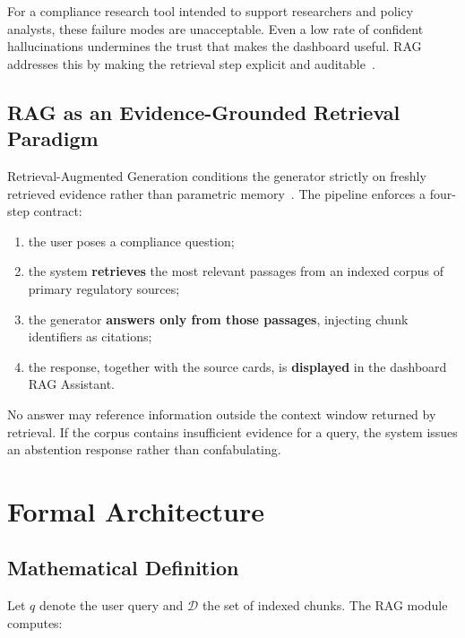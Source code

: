 For a compliance research tool intended to support researchers and policy analysts,
these failure modes are unacceptable. Even a low rate of confident hallucinations
undermines the trust that makes the dashboard useful. RAG addresses this by making
the retrieval step explicit and auditable~\cite{lewis2020rag}.

\subsection{RAG as an Evidence-Grounded Retrieval Paradigm}
\label{sec:rag-paradigm}

Retrieval-Augmented Generation conditions the generator strictly on freshly retrieved
evidence rather than parametric memory~\cite{lewis2020rag,karpukhin2020}. The
pipeline enforces a four-step contract:

\begin{enumerate}[noitemsep]
  \item the user poses a compliance question;
  \item the system \textbf{retrieves} the most relevant passages from an indexed
        corpus of primary regulatory sources;
  \item the generator \textbf{answers only from those passages}, injecting chunk
        identifiers as citations;
  \item the response, together with the source cards, is \textbf{displayed} in
        the dashboard RAG Assistant.
\end{enumerate}

No answer may reference information outside the context window returned by retrieval.
If the corpus contains insufficient evidence for a query, the system issues an
abstention response rather than confabulating.

\section{Formal Architecture}
\label{sec:rag-arch-formal}

\subsection{Mathematical Definition}
\label{sec:rag-math}

Let $q$ denote the user query and $\mathcal{D}$ the set of indexed chunks. The
RAG module computes:

